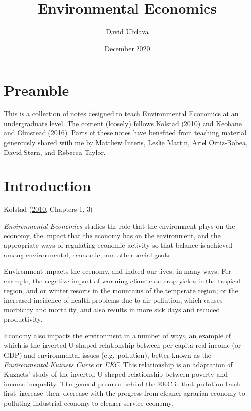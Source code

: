 \documentclass[
]{book}
\title{Environmental Economics}
\author{David Ubilava}
\date{December 2020}
\begin{document}
\maketitle

{
\setcounter{tocdepth}{1}
\tableofcontents
}
\hypertarget{preamble}{%
\chapter*{Preamble}\label{preamble}}

This is a collection of notes designed to teach Environmental Economics at an undergraduate level. The content (loosely) follows Kolstad (\protect\hyperlink{ref-kolstad2010}{2010}) and Keohane and Olmstead (\protect\hyperlink{ref-keohane2016}{2016}). Parts of these notes have benefited from teaching material generously shared with me by Matthew Interis, Leslie Martin, Ariel Ortiz-Bobea, David Stern, and Rebecca Taylor.

\hypertarget{introduction}{%
\chapter{Introduction}\label{introduction}}

Kolstad (\protect\hyperlink{ref-kolstad2010}{2010}, Chapters 1, 3)

\emph{Environmental Economics} studies the role that the environment plays on the economy, the impact that the economy has on the environment, and the appropriate ways of regulating economic activity so that balance is achieved among environmental, economic, and other social goals.

Environment impacts the economy, and indeed our lives, in many ways. For example, the negative impact of warming climate on crop yields in the tropical region, and on winter resorts in the mountains of the temperate region; or the increased incidence of health problems due to air pollution, which causes morbidity and mortality, and also results in more sick days and reduced productivity.

Economy also impacts the environment in a number of ways, an example of which is the inverted U-shaped relationship between per capita real income (or GDP) and environmental issues (e.g.~pollution), better known as the \emph{Environmental Kuznets Curve} or \emph{EKC}. This relationship is an adaptation of Kuznets' study of the inverted U-shaped relationship between poverty and income inequality. The general premise behind the EKC is that pollution levels first--increase--then--decrease with the progress from cleaner agrarian economy to polluting industrial economy to cleaner service economy.
\end{document}
